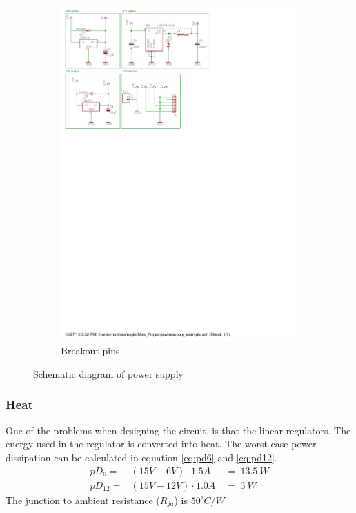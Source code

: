 \begin{figure}[H]
\begin{subfigure}{0.4\linewidth}
\includegraphics[scale=0.8,trim={5.3cm 18.5cm 10.4cm 6.0cm},clip]{img/powersupply.pdf}
\caption{Breakout pins.}
\label{fig::sch_power_pins}
\end{subfigure}
\caption{Schematic diagram of power supply}
\label{fig::sch_power}
\end{figure}

\subsubsection{Heat}
One of the problems when designing the circuit, is that the linear regulators.
The energy used in the regulator is converted into heat.
The worst case power dissipation can be calculated in equation \ref{eq:pd6} and \ref{eq:pd12}.
\begin{eqnarray}
pD_{6}  =& (15V - 6V) \cdot 1.5A\ &=\ 13.5\ W \label{eq:pd6}\\
pD_{12} =& (15V - 12V)\cdot 1.0A\ &=\ 3\ W \label{eq:pd12}
\end{eqnarray}
The junction to ambient resistance ($R_{ja}$) is $50^\circ C/W$\cite{ds:L7806CV,ds:LM78XX}%

